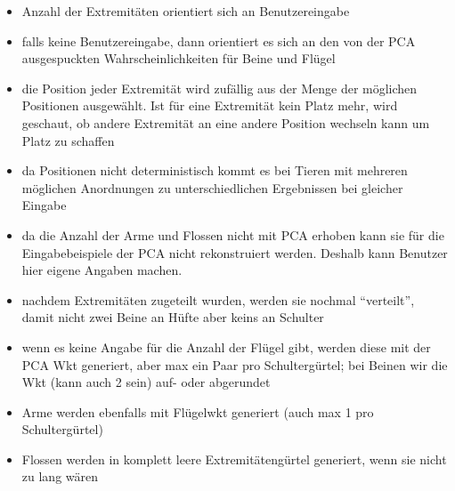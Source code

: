 \begin{itemize}
 \item Anzahl der Extremitäten orientiert sich an Benutzereingabe
 \item falls keine Benutzereingabe, dann orientiert es sich an den von der PCA ausgespuckten Wahrscheinlichkeiten für Beine und Flügel
 \item die Position jeder Extremität wird zufällig aus der Menge der möglichen Positionen ausgewählt. Ist für eine Extremität kein Platz mehr, wird geschaut, ob andere Extremität an eine andere Position wechseln kann um Platz zu schaffen
 \item da Positionen nicht deterministisch kommt es bei Tieren mit mehreren möglichen Anordnungen zu unterschiedlichen Ergebnissen bei gleicher Eingabe
 \item da die Anzahl der Arme und Flossen nicht mit PCA erhoben kann sie für die Eingabebeispiele der PCA nicht rekonstruiert werden. Deshalb kann Benutzer hier eigene Angaben machen.
 \item nachdem Extremitäten zugeteilt wurden, werden sie nochmal "`verteilt"', damit nicht \zb zwei Beine an Hüfte aber keins an Schulter 
 \item wenn es keine Angabe für die Anzahl der Flügel gibt, werden diese mit der PCA Wkt generiert, aber max ein Paar pro Schultergürtel; bei Beinen wir die Wkt (kann auch 2 sein) auf- oder abgerundet
 \item Arme werden ebenfalls mit Flügelwkt generiert (auch max 1 pro Schultergürtel)
 \item Flossen werden in komplett leere Extremitätengürtel generiert, wenn sie nicht zu lang wären
\end{itemize}



